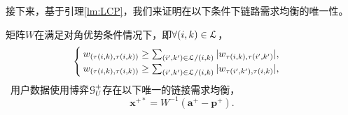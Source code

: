 接下来，基于引理\ref{lm:LCP}，我们来证明在以下条件下链路需求均衡的唯一性。


\begin{thm}\label{thm:unique}
矩阵$W$在满足对角优势条件情况下，即$\forall(i,k)\in\mathcal{L}$，
\begin{equation}\label{eq:condition}
  \begin{cases}
  w_{(\tau(i,k),\tau(i,k))}\geq\sum_{(i',k')\in\mathcal{L}/(i,k)}|w_{\tau(i,k),\tau(i',k')}|, \\
  w_{(\tau(i,k),\tau(i,k))}\geq\sum_{(i',k')\in\mathcal{L}/(i,k)}|w_{\tau(i',k'),\tau(i,k)}|,
  \end{cases}
 \end{equation}
 用户数据使用博弈$\mathcal{G}_U^+$存在以下唯一的链接需求均衡，
  \begin{equation}\label{eq:LDE}
  	\mathbf{x}^{+*}=W^{-1}(\mathbf{a}^{+}-\mathbf{p}^{+}).
  \end{equation}
\end{thm}
